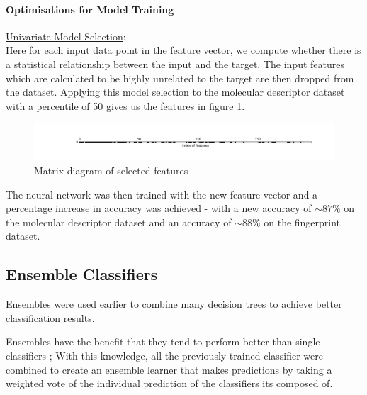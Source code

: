 \documentclass[a4paper,12pt]{report}
\begin{document}
			\paragraph{Optimisations for Model Training} 
			\underline{Univariate Model Selection}: \\
			Here for each input data point in the feature vector, we compute whether there is a statistical relationship between the input and the target. The input features which are calculated to be highly unrelated to the target are then dropped from the dataset. Applying this model selection to the molecular descriptor dataset with a percentile of 50 gives us the features in figure \ref{fig:neuralnetworksmdunivariate}.
				\begin{figure}[h]
					\centering
					\includegraphics[width=\textwidth,scale=1]{images/neural_network_smd_univariate_matrix}
					\caption{Matrix diagram of selected features}
					\label{fig:neuralnetworksmdunivariate}
				\end{figure}
			The neural network was then trained with the new feature vector and a percentage increase in accuracy was achieved - with a new accuracy of $\sim87\%$ on the molecular descriptor dataset and an accuracy of $\sim88\%$ on the fingerprint dataset.
			
			
			
		\subsection{Ensemble Classifiers} \label{subsection:ensemble}
		Ensembles were used earlier to combine many decision trees to achieve better classification results. 
		
		Ensembles have the benefit that they tend to perform better than single classifiers \cite{Dietterich}; With this knowledge, all the previously trained classifier were combined to create an ensemble learner that makes predictions by taking a weighted vote of the individual prediction of the classifiers its composed of.
		
\end{document}

